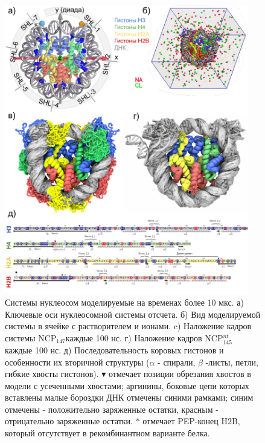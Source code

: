 \begin{figure}[H]
    \centering
    \includegraphics[width=0.95\textwidth]{images/p2/10ms/fig1.pdf}
    \caption[Системы нуклеосом моделируемые на временах более 10 мкс]{Системы нуклеосом моделируемые на временах более 10 мкс. а) Ключевые оси нуклеосомной системы отсчета. б) Вид моделируемой системы в ячейке с растворителем и ионами. c) Наложение кадров системы NCP$_{147} $каждые 100 нс. г) Наложение кадров NCP$^{nt}_{145}$ каждые 100 нс. д) Последовательность коровых гистонов и особенности их вторичной структуры ($ \alpha $ - спирали, $ \beta $ -листы, петли, гибкие хвосты гистонов). $ \blacktriangledown $ отмечает позиции обрезания хвостов в модели с усеченными хвостами; аргинины, боковые цепи которых вставлены малые бороздки ДНК отмечены синими рамками; синим отмечены - положительно заряженные остатки, красным - отрицательно заряженные остатки. $*$ отмечает PEP-конец H2B, который отсутствует в рекомбинантном варианте белка.}
    \label{fig:p2_3:f1}
\end{figure}

